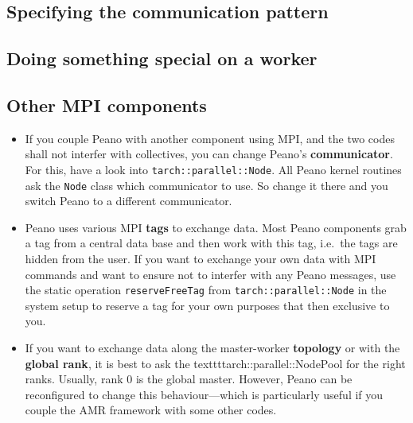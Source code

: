 \subsection{Specifying the communication pattern}

\subsection{Doing something special on a worker}



\subsection{Other MPI components}

\begin{itemize}
  \item If you couple Peano with another component using MPI, and the two codes
  shall not interfer with collectives, you can change Peano's {\bf
  communicator}.
  For this, have a look into \texttt{tarch::parallel::Node}. All Peano kernel
  routines ask the \texttt{Node} class which communicator to use. So change it
  there and you switch Peano to a different communicator.
  \item Peano uses various MPI {\bf tags} to exchange data. Most Peano
  components grab a tag from a central data base and then work with this tag,
  i.e.~the tags are hidden from the user. If you want to exchange your own data
  with MPI commands and want to ensure not to interfer with any Peano messages,
  use the static operation \texttt{reserveFreeTag} from
  \texttt{tarch::parallel::Node} in the system setup to reserve a tag for your
  own purposes that then exclusive to you.
  \item If you want to exchange data along the master-worker {\bf topology} or
  with the {\bf global rank}, it is best to ask the
  texttt{tarch::parallel::NodePool} for the right ranks. Usually, rank 0 is the
  global master. However, Peano can be reconfigured to change this
  behaviour---which is particularly useful if you couple the AMR framework with
  some other codes.
\end{itemize}
